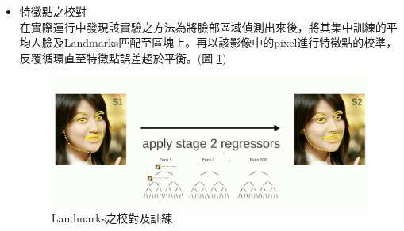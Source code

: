 \documentclass[12pt]{article}  %
\theoremstyle{plain}
\begin{document}
\begin{itemize}
\item 特徵點之校對 \\
在實際運行中發現該實驗之方法為將臉部區域偵測出來後，將其集中訓練的平均人臉及Landmarks匹配至區塊上。再以該影像中的pixel進行特徵點的校準，反覆循環直至特徵點誤差趨於平衡。(圖 \ref{landmarks_train})
\begin{figure}[htbp]
\centering
\includegraphics[width=13cm]{pic/ch3/landmarks_train.jpg}
\caption{Landmarks之校對及訓練} \label{landmarks_train}
\end{figure}
\end{itemize}
\newpage
\end{document}

